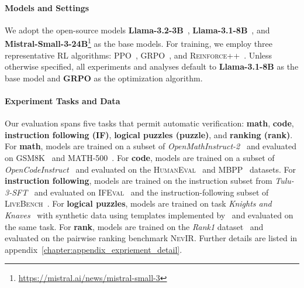 \documentclass{article} %
\begin{document}
\paragraph{Models and Settings} 
We adopt the open-source models \textbf{Llama-3.2-3B}~\citep{grattafiori2024llama}, \textbf{Llama-3.1-8B}~\citep{grattafiori2024llama}, and \textbf{Mistral-Small-3-24B}\footnote{\url{https://mistral.ai/news/mistral-small-3}} as the base models. For training, we employ three representative RL algorithms: PPO~\citep{schulman2017proximal}, GRPO~\citep{shao2024deepseekmath}, and \textsc{Reinforce}++~\citep{ahmadian2024back}. Unless otherwise specified, all experiments and analyses default to \textbf{Llama-3.1-8B} as the base model and \textbf{GRPO} as the optimization algorithm.  


\paragraph{Experiment Tasks and Data}
Our evaluation spans five tasks that permit automatic verification: \textbf{math}, \textbf{code}, \textbf{instruction following (IF)}, \textbf{logical puzzles (puzzle)}, and \textbf{ranking (rank)}.  
For \textbf{math}, models are trained on a subset of \textit{OpenMathInstruct-2}~\citep{ahmad2025opencodeinstructlargescaleinstructiontuning} and evaluated on \textsc{GSM8K}~\citep{cobbe2021training} and \textsc{MATH-500}~\citep{hendrycks2021measuring,lightman2023let}. 
For \textbf{code}, models are trained on a subset of \textit{OpenCodeInstruct}~\citep{ahmad2025opencodeinstructlargescaleinstructiontuning} and evaluated on  the \textsc{HumanEval}~\citep{chen2021evaluating} and \textsc{MBPP}~\citep{austin2021program} datasets. 
For \textbf{instruction following}, models are trained on the instruction subset from \textit{Tulu-3-SFT}~\citep{lambert2025tulu3pushingfrontiers} and evaluated on \textsc{IFEval}~\citep{zhou2023instruction} and the instruction-following subset of \textsc{LiveBench}~\citep{white2024livebench}. 
For \textbf{logical puzzles}, models are trained on task \textit{Knights and Knaves}~\citep{johnson1990meta} with synthetic data using templates implemented by~\cite{xie2024memorization} and evaluated on the same task.
For \textbf{rank}, models are trained on the \textit{Rank1} dataset~\citep{weller2025rank1testtimecomputereranking} and evaluated on the pairwise ranking benchmark \textsc{NevIR}. Further details are listed in appendix~\ref{chapter:appendix_expriement_detail}.
\end{document}
